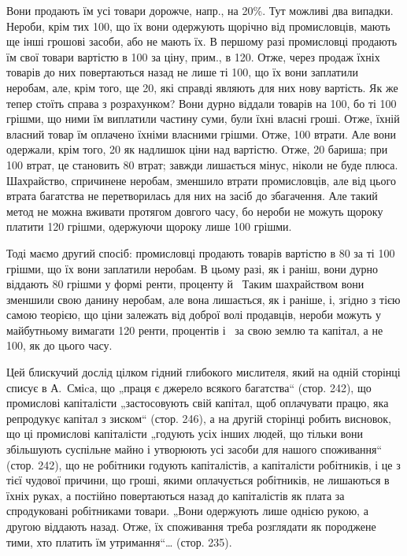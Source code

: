 \parcont{}  %
Вони продають їм усі товари дорожче, напр., на 20\%. Тут можливі два випадки. Нероби, крім
тих 100, що їх вони одержують щорічно від промисловців, мають ще інші грошові засоби, або
не мають їх. В першому разі промисловці продають їм свої товари вартістю в 100 за ціну,
прим., в 120. Отже, через продаж їхніх товарів до них повертаються назад не лише ті 100, що їх вони заплатили неробам, але, крім того, ще 20, які справді являють для них
нову вартість. Як же тепер стоїть справа з розрахунком? Вони дурно віддали товарів на 100,
бо ті 100 грішми, що ними їм виплатили частину суми, були їхні власні гроші. Отже, їхній
власний товар їм оплачено їхніми власними грішми. Отже, 100 втрати. Але вони одержали,
крім того, 20 як надлишок ціни над вартістю. Отже, 20 бариша; при 100
втрат, це становить 80 втрат; завжди лишається мінус, ніколи не буде плюса. Шахрайство,
спричинене неробам, зменшило втрати промисловців, але від цього втрата багатства не перетворилась
для них на засіб до збагачення. Але такий метод не можна вживати протягом довгого часу, бо нероби не
можуть щороку платити 120 грішми, одержуючи щороку лише 100 грішми.

Тоді маємо другий спосіб: промисловці продають товарів вартістю в 80 за ті 100
грішми, що їх вони заплатили неробам. В цьому разі, як і раніш, вони дурно віддають 80
грішми у формі ренти, проценту й~ Таким шахрайством вони зменшили свою данину неробам, але
вона лишається, як і раніше, і, згідно з тією самою теорією, що ціни залежать від доброї волі
продавців, нероби можуть у майбутньому вимагати 120 ренти, процентів і~ за свою
землю та капітал, а не 100, як до цього часу.

Цей блискучий дослід цілком гідний глибокого мислителя, який на одній сторінці списує в А.~Сміcа, що
„праця є джерело всякого багатства“ (стор. 242), що промислові капіталісти „застосовують свій
капітал, щоб оплачувати працю, яка репродукує капітал з зиском“ (стор. 246), а на другій сторінці
робить висновок, що ці промислові капіталісти „годують
усіх інших людей, що тільки вони збільшують суспільне майно і утворюють усі засоби для нашого
споживання“ (стор. 242), що не робітники годують капіталістів, а капіталісти робітників, і це з тієї
чудової причини, що гроші, якими оплачується робітників, не лишаються в їхніх руках, а постійно
повертаються назад до капіталістів як плата за спродуковані робітниками товари. „Вони одержують лише
однією рукою, а другою віддають назад. Отже, їх споживання треба розглядати як породжене тими, хто
платить їм утримання“\dots{} (стор. 235).

